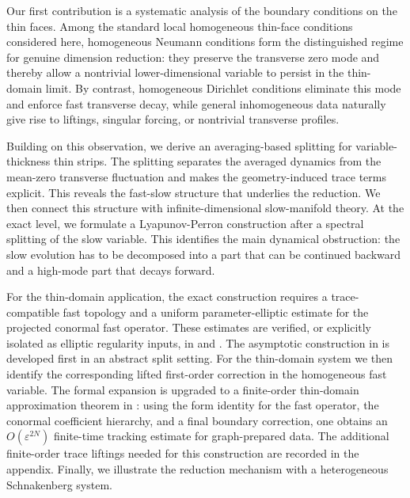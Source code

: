 \documentclass[11pt]{article}
\theoremstyle{definition}
\theoremstyle{remark}
\numberwithin{equation}{section}
\begin{document}
Our first contribution is a systematic analysis of the
boundary conditions on the thin faces. Among the standard local homogeneous
thin-face conditions considered here, homogeneous Neumann conditions form the
distinguished regime for genuine dimension reduction: they preserve the
transverse zero mode and thereby allow a nontrivial lower-dimensional variable
to persist in the thin-domain limit. By contrast, homogeneous Dirichlet
conditions eliminate this mode and enforce fast transverse decay, while general
inhomogeneous data naturally give rise to liftings, singular forcing, or
nontrivial transverse profiles.

Building on this observation, we derive an averaging-based splitting for
variable-thickness thin strips. The splitting separates the averaged dynamics
from the mean-zero transverse fluctuation and makes the geometry-induced trace
terms explicit. This reveals the fast-slow structure that underlies the
reduction. We then connect this structure with infinite-dimensional
slow-manifold theory. At the exact level, we formulate a Lyapunov-Perron
construction after a spectral splitting of the slow variable. This identifies
the main dynamical obstruction: the slow evolution has to be decomposed into a
part that can be continued backward and a high-mode part that decays forward.

For the thin-domain application, the exact construction requires a
trace-compatible fast topology and a uniform parameter-elliptic estimate for the
projected conormal fast operator. These estimates are verified, or explicitly
isolated as elliptic regularity inputs, in 
and . The asymptotic construction
in  is developed first in an abstract split setting. For the
thin-domain system we then identify the corresponding lifted first-order
correction in the homogeneous fast variable. The formal expansion is upgraded to
a finite-order thin-domain approximation theorem in
: using the form identity for the
fast operator, the conormal coefficient hierarchy, and a final boundary
correction, one obtains an \(O(\varepsilon^{2N})\) finite-time tracking estimate
for graph-prepared data. The additional finite-order trace liftings needed for
this construction are recorded in the appendix. Finally, we illustrate the
reduction mechanism with a heterogeneous Schnakenberg system.\\
\end{document}
